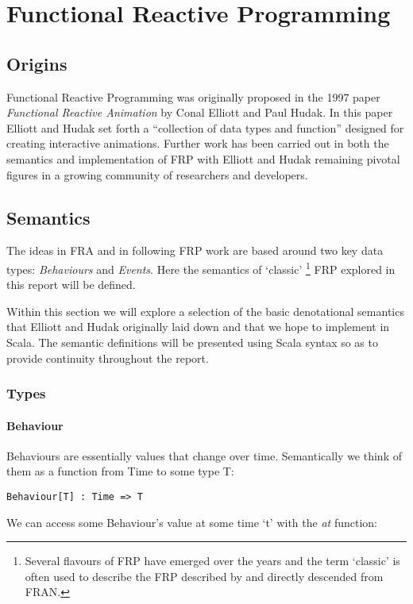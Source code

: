 \chapter{Functional Reactive Programming}
  \section{Origins}
    Functional Reactive Programming was originally proposed in the 1997 paper \emph{Functional
    Reactive Animation} by Conal Elliott and Paul Hudak. In this paper Elliott and Hudak
    set forth a ``collection of data types and function'' designed for creating interactive 
    animations. Further work has been carried out in both the semantics and implementation
    of FRP with Elliott and Hudak remaining pivotal figures in a growing community of researchers
    and developers.
    
  \section{Semantics}
    The ideas in FRA and in following FRP work are based around two key data types: 
    \emph{Behaviours} and \emph{Events}. Here the semantics of `classic' \footnote{Several
    flavours of FRP have emerged over the years and the term `classic' is often used to describe
    the FRP described by and directly descended from FRAN.} FRP explored in this report will be defined.
    
    Within this section we will explore a selection of the basic denotational semantics that Elliott
    and Hudak originally laid down and that we hope to implement in Scala. The semantic definitions will
    be presented using Scala syntax so as to provide continuity throughout the report.
  
    \subsection{Types}
      \subsubsection{Behaviour}
        Behaviours are essentially values that change over time. Semantically we think of them as
        a function from Time to some type T:

\begin{verbatim}
Behaviour[T] : Time => T
\end{verbatim}
        
        We can access some Behaviour's value at some time `t' with the \emph{at} function:

